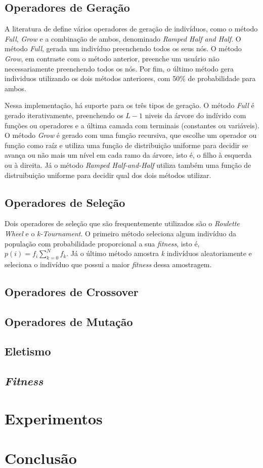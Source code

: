 \documentclass[a4paper]{paper}
\begin{document}
\subsection{Operadores de Geração}

A literatura de define vários operadores de geração de indivíduos, como o método
\textit{Full}, \textit{Grow} e a combinação de ambos, denominado \textit{Ramped
  Half and Half}. O método \textit{Full}, gerada um indivíduo preenchendo todos os
seus nós. O método \textit{Grow}, em contraste com o método anterior, preenche
um usuário não necessariamente preenchendo todos os nós. Por fim, o último método
gera individuos utilizando os dois métodos anteriores, com 50\% de probabilidade
para ambos.

Nessa implementação, há suporte para os três tipos de geração. O método
\textit{Full} é gerado iterativamente, preenchendo os $L-1$ niveis da árvore do
indívido com funções ou operadores e a última camada com terminais (constantes
ou variáveis).  O método \textit{Grow} é gerado com uma função recursiva, que
escolhe um operador ou função como raíz e utiliza uma função de distribuição
uniforme para decidir se avança ou não mais um nível em cada ramo da árvore,
isto é, o filho à esquerda ou à direita. Já o método \textit{Ramped
  Half-and-Half} utiliza também uma função de distruibuição uniforme para
decidir qual dos dois métodos utilizar.

\subsection{Operadores de Seleção}

Dois operadores de seleção que são frequentemente utilizados são o
\textit{Roulette Wheel} e o \textit{k-Tournament}. O primeiro método seleciona
algum indivíduo da população com probabilidade proporcional a sua
\textit{fitness}, isto é, $p(i)=f_i\sum_{k=0}^{N}f_k$. Já o último método
amostra \textit{k} indivíduos aleatoriamente e seleciona o indivíduo que possui
a maior \textit{fitness} dessa amostragem.

\subsection{Operadores de Crossover}
\subsection{Operadores de Mutação}
\subsection{Eletismo}
\subsection{\textit{Fitness}}

\section{Experimentos}
\section{Conclusão}
\end{document}
